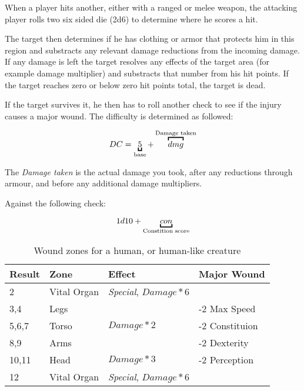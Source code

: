 When a player hits another, either with a ranged or melee weapon, the attacking
player rolls two six sided die (2d6) to determine where he scores a hit.

The target then determines if he has clothing or armor that protects him in this
region and substracts any relevant damage reductions from the incoming damage.
If any damage is left the target resolves any effects of the target area (for
example damage multiplier) and substracts that number from his hit points. If
the target reaches zero or below zero hit points total, the target is dead.

If the target survives it, he then has to roll another check to see if the
injury causes a major wound. The difficulty is determined as followed:

\[
DC = \ub{5}{base} + \ob{dmg}{Damage taken}
\]

The \emph{Damage taken} is the actual damage you took, after any reductions
through armour, and before any additional damage multipliers.

Against the following check:

\[
1d10 + \ub{con}{Constition score}
\]

\begin{table}
  \caption{Wound zones for a human, or human-like creature}
  \begin{center}
    \begin{tabular}{|l|l|l|l|}
      \hline
      Result& Zone         & Effect                           & Major Wound     \\ \hline
      2     & Vital Organ  & \emph{Special}, \(Damage * 6\)   &                 \\ \hline
      3,4   & Legs         &                                  & -2 Max Speed        \\ \hline
      5,6,7 & Torso        & \(Damage * 2\)                   & -2 Constituion  \\ \hline
      8,9   & Arms         &                                  & -2 Dexterity    \\ \hline
      10,11 & Head         & \(Damage * 3\)                   & -2 Perception   \\ \hline
      12    & Vital Organ  & \emph{Special}, \(Damage * 6\)   &                 \\
      \hline
    \end{tabular}
  \end{center}
\end{table}


